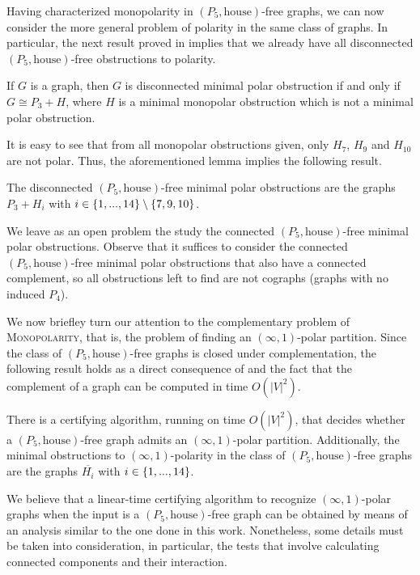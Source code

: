 Having characterized monopolarity in $(P_5,\text{house})$-free graphs, we can
now consider the more general problem of polarity in the same class of graphs.
In particular, the next result proved in \cite{Contreras2024} implies that we
already have all disconnected $(P_5,\text{house})$-free obstructions to
polarity.

\begin{lemma}
    If $G$ is a graph, then $G$ is disconnected minimal polar obstruction if and
    only if $G \cong P_3 + H$, where $H$ is a minimal monopolar obstruction
    which is not a minimal polar obstruction.
\end{lemma}

It is easy to see that from all monopolar obstructions given, only $H_7$, $H_9$
and $H_{10}$ are not polar. Thus, the aforementioned lemma implies the following
result.

\begin{corollary}
    The disconnected $(P_5,\text{house})$-free minimal polar obstructions are
    the graphs $P_3 + H_i$ with $i\in \left\{1,...,14\right\}\setminus \left\{7,9,10\right\}$.
\end{corollary}

We leave as an open problem the study the connected $(P_5,\text{house})$-free
minimal polar obstructions.  Observe that it suffices to consider the connected
$(P_5,\text{house})$-free minimal polar obstructions that also have a connected
complement, so all obstructions left to find are not cographs (graphs with no
induced $P_4$).

We now briefley turn our attention to the complementary problem of
\textsc{Monopolarity}, that is, the problem of finding an $(\infty,1)$-polar
partition. Since the class of $(P_5,\text{house})$-free graphs is closed under
complementation, the following result holds as a direct consequence of
 and the fact that
the complement of a graph can be computed in time $O(|V|^2)$.

\begin{corollary}
    There is a certifying algorithm, running on time $O(|V|^2)$, that decides
    whether a $(P_5,\text{house})$-free graph admits an $(\infty,1)$-polar
    partition. Additionally, the minimal obstructions to $(\infty,1)$-polarity
    in the class of $(P_5,\text{house})$-free graphs are the graphs
    $\overline{H_i}$ with $i\in \left\{1,...,14\right\}$.
\end{corollary}

We believe that a linear-time certifying algorithm to recognize
$(\infty,1)$-polar graphs when the input is a $(P_5, \text{house})$-free graph
can be obtained by means of an analysis similar to the one done in this work.
Nonetheless, some details must be taken into consideration, in particular, the
tests that involve calculating connected components and their interaction.

